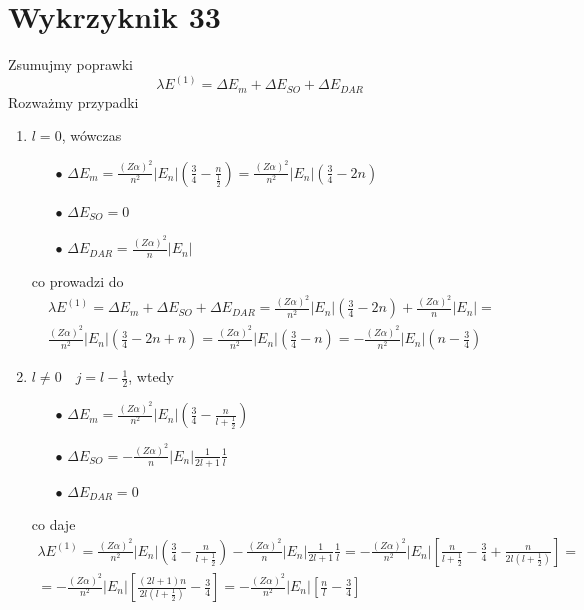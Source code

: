 \documentclass[a4paper,12pt]{article}
\begin{document}
\section{Wykrzyknik 33}
	 Zsumujmy poprawki
	 $$
	 \lambda E^{(1)} = \Delta E_m + \Delta E_{SO} + \Delta E_{DAR}
	 $$
	 Rozważmy przypadki
		 \begin{enumerate}
		 	\item $l = 0$, wówczas
		 		\begin{itemize}
		 			\item[$\bullet$] $\Delta E_m = \frac{(Z\alpha)^2}{n^2}|E_n|\left(\frac{3}{4}  -\frac{n}{\frac{1}{2}} \right) =\frac{(Z\alpha)^2}{n^2}|E_n|\left(\frac{3}{4} -2n \right) $
		 			\item[$\bullet$] $\Delta E_{SO} = 0$
		 			\item[$\bullet$] $\Delta E_{DAR} = \frac{(Z\alpha)^2}{n}|E_n| $
		 		\end{itemize}
	 			co prowadzi do 
	 			$$
	 			\begin{gathered}
		 			\lambda E^{(1)} = \Delta E_m + \Delta E_{SO} + \Delta E_{DAR} = \frac{(Z\alpha)^2}{n^2}|E_n|\left(\frac{3}{4} -2n \right) + \frac{(Z\alpha)^2}{n}|E_n| = \\
		 			\frac{(Z\alpha)^2}{n^2}|E_n| \left(\frac{3}{4} -2n + n \right) = \frac{(Z\alpha)^2}{n^2}|E_n| \left(\frac{3}{4} -n  \right) = -\frac{(Z\alpha)^2}{n^2}|E_n| \left(n-\frac{3}{4}   \right)
	 			\end{gathered}
	 			$$
	 		\item $l\neq 0\quad j = l - \frac{1}{2}$, wtedy 
	 				\begin{itemize}
	 					\item[$\bullet$] $\Delta E_m = \frac{(Z\alpha)^2}{n^2}|E_n|\left(\frac{3}{4}  -\frac{n}{l+\frac{1}{2}} \right) $
	 					\item[$\bullet$] $\Delta E_{SO} = -\frac{(Z\alpha)^2}{n}|E_n|\frac{1}{2l+1}\frac{1}{l} $
	 					\item[$\bullet$] $\Delta E_{DAR} = 0  $
	 				\end{itemize}
 				co daje
 				$$
 				\begin{gathered}
 					\lambda E^{(1)} = \frac{(Z\alpha)^2}{n^2}|E_n|\left(\frac{3}{4}  -\frac{n}{l+\frac{1}{2}} \right) - \frac{(Z\alpha)^2}{n}|E_n|\frac{1}{2l+1}\frac{1}{l} =
 					-\frac{(Z\alpha)^2}{n^2}|E_n|\left[  \frac{n}{l+\frac{1}{2}}  - \frac{3}{4} + \frac{n}{2l(l+\frac{1}{2})}   \right] =\\
 					=-\frac{(Z\alpha)^2}{n^2}|E_n|\left[ \frac{(2l+1)n}{2l(l+\frac{1}{2})} - \frac{3}{4}\right] = -\frac{(Z\alpha)^2}{n^2}|E_n|\left[ \frac{n}{l} - \frac{3}{4}\right] 

\end{gathered}$$
\end{enumerate}
\end{document}
